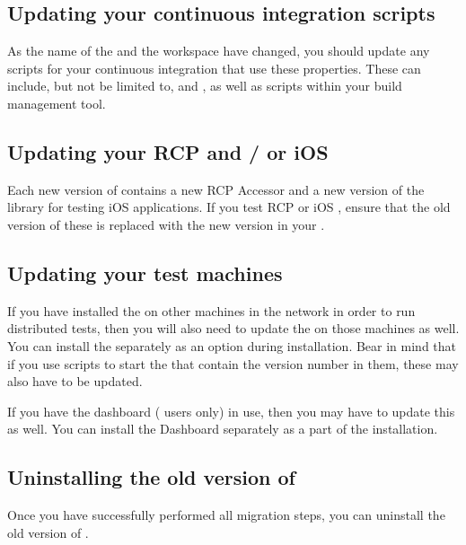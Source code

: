 \subsection{Updating your continuous integration scripts}
 As the name of the \gddb{} and the workspace have changed, you should update any scripts for your continuous integration that use these properties. These can include, but not be limited to,  and , as well as scripts within your build management tool.


\subsection{Updating your RCP and / or iOS \gdauts{}} 
Each new version of \app{} contains a new RCP Accessor and a new version of the library for testing iOS applications. If you test RCP or iOS \gdauts{}, ensure that the old version of these is replaced with the new version in your \gdaut{}.

\subsection{Updating your test machines}
If you have installed the \gdagent{} on other machines in the network in order to run distributed tests, then you will also need to update the \gdagent{} on those machines as well. You can install the \gdagent{} separately as an option during installation. Bear in mind that if you use scripts to start the \gdagent{} that contain the version number in them, these may also have to be updated. 


If you have the dashboard (\gd{} users only) in use, then you may have to update this as well. You can install the Dashboard separately as a part of the installation.
 
\subsection{Uninstalling the old version of \app{}}
Once you have successfully performed all migration steps, you can uninstall the old version of \app{}. 













